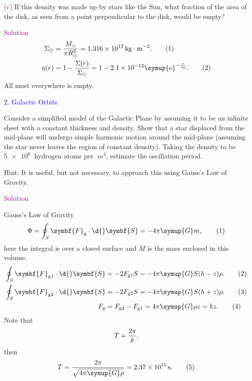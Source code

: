 \documentclass[UTF8, 12pt, a4paper, oneside, twocolumn, fontset=none]{ctexart}
\begin{document}
\hspace*{\fill}

\noindent\textcolor{purple}{(c)} If this density was made up by stars like the Sun, what fraction of the area of the disk, as seen from a point perpendicular to the disk, would be empty?

\hspace*{\fill}

\noindent\textcolor{purple}{Solution}
\begin{align}
\Sigma_{\odot}&=\frac{M_{\odot}}{\pi{}R_{\odot}^{2}}=\qty{1.316e12}{kg\cdot{}m^{-2}}.\tag{1}\\
\eta\mleft(r\mright)&=1-\frac{\Sigma\mleft(r\mright)}{\Sigma_{\odot}}=1-2.1\times10^{-12}\symup{e}^{-\frac{r}{r_{0}}}.\tag{2}
\end{align}
All most everywhere is empty.

\hspace*{\fill}

\noindent\textcolor{blue}{2. Galactic Orbits}

\noindent Consider a simplified model of the Galactic Plane by assuming it to be an infinite sheet with a constant thickness and density. Show that a star displaced from the mid-plane will undergo simple harmonic motion around the mid-plane (assuming the star never leaves the region of constant density). Taking the density to be $\qty{5e6}{}$ hydrogen atoms per $\qty{}{m^{3}}$, estimate the oscillation period.

\noindent Hint: It is useful, but not necessary, to approach this using Gauss's Law of Gravity.

\hspace*{\fill}

\noindent\textcolor{purple}{Solution}

Gauss's Law of Gravity
\begin{equation}
\Phi=\oint_{S}\symbf{F}_{\mathrm{g}}\cdot\d{}\symbf{S}=-4\pi\symup{G}m,\tag{1}
\end{equation}
here the integral is over a closed surface and $M$ is the mass enclosed in this volume.
\begin{align}
\oint_{S}\symbf{F}_{\mathrm{g}1}\cdot\d{}\symbf{S}&=-2F_{\mathrm{g}1}S=-4\pi\symup{G}S\mleft(h-z\mright)\rho.\tag{2}\\
\oint_{S}\symbf{F}_{\mathrm{g}2}\cdot\d{}\symbf{S}&=-2F_{\mathrm{g}2}S=-4\pi\symup{G}S\mleft(h+z\mright)\rho.\tag{3}\\
F_{\mathrm{g}}&=F_{\mathrm{g}2}-F_{\mathrm{g}1}=4\pi\symup{G}\rho{}z=kz.\tag{4}
\end{align}
Note that
\begin{equation}
T=\frac{2\pi}{k},\notag
\end{equation}
then
\begin{equation}
T=\frac{2\pi}{\sqrt{4\pi\symup{G}\rho}}=\qty{2.37e15}{s}.\tag{5}
\end{equation}

\end{document}
